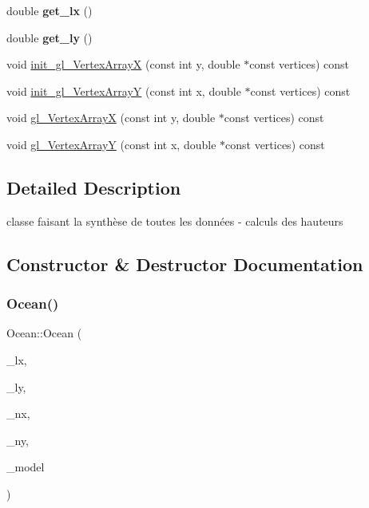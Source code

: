 \begin{DoxyCompactItemize}
double {\bfseries get\+\_\+lx} ()
\item 
\hypertarget{class_ocean_abe5c5b3d24ed7521b351e2be630623db}{}\label{class_ocean_abe5c5b3d24ed7521b351e2be630623db} 
double {\bfseries get\+\_\+ly} ()
\item 
void \hyperlink{class_ocean_ad10379d1f92b154eca3936860c96b4f4}{init\+\_\+gl\+\_\+\+Vertex\+ArrayX} (const int y, double $\ast$const vertices) const
\item 
void \hyperlink{class_ocean_a1adbab4eeb806026aff3fb730ca3fe5c}{init\+\_\+gl\+\_\+\+Vertex\+ArrayY} (const int x, double $\ast$const vertices) const
\item 
void \hyperlink{class_ocean_abd9dcb14e3ec076a8623099c0445dc5c}{gl\+\_\+\+Vertex\+ArrayX} (const int y, double $\ast$const vertices) const
\item 
void \hyperlink{class_ocean_a1100e965070ccb68a8f0bec5d5b60a5c}{gl\+\_\+\+Vertex\+ArrayY} (const int x, double $\ast$const vertices) const
\end{DoxyCompactItemize}


\subsection{Detailed Description}
classe faisant la synthèse de toutes les données -\/ calculs des hauteurs 

\subsection{Constructor \& Destructor Documentation}
\hypertarget{class_ocean_a6a56fee065163c5bd6e5286879648407}{}\label{class_ocean_a6a56fee065163c5bd6e5286879648407} 
\subsubsection{\texorpdfstring{Ocean()}{Ocean()}}
{\footnotesize\ttfamily Ocean\+::\+Ocean (\begin{DoxyParamCaption}\item[{double}]{\+\_\+lx,  }\item[{double}]{\+\_\+ly,  }\item[{int}]{\+\_\+nx,  }\item[{int}]{\+\_\+ny,  }\item[{\hyperlink{class_wave_model}{Wave\+Model} $\ast$}]{\+\_\+model }\end{DoxyParamCaption})}




